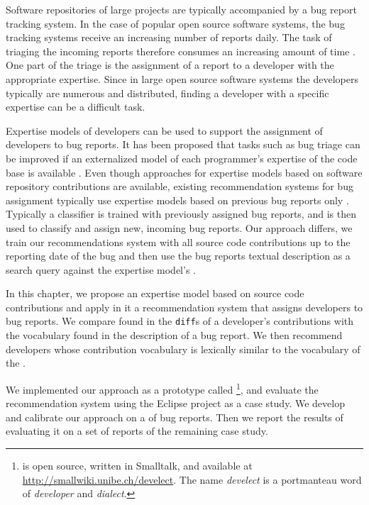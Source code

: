 Software repositories of large projects are typically accompanied by a bug report tracking system. In the case of popular open source software systems, the bug tracking systems receive an increasing number of reports daily. The task of triaging the incoming reports therefore consumes an increasing amount of time \cite{Anvi06b}. One part of the triage is the assignment of a report to a developer with the appropriate expertise. Since in large open source software systems the developers typically are numerous and distributed, finding a developer with a specific expertise can be a difficult task.

Expertise models of developers can be used to support the assignment of developers to bug reports. It has been proposed that tasks such as bug triage can be improved if an externalized model of each programmer's expertise of the code base is available \cite{Frit07a}. Even though approaches for expertise models based on software repository contributions are available, existing recommendation systems for bug assignment typically use expertise models based on previous bug reports only \cite{Anvi06a,Canf05a,Cubr04b,Mock02b,Lucc02a}.
Typically a classifier is trained with previously assigned bug reports, and is then used to classify and assign new, incoming bug reports.
Our approach differs, we train our recommendations system with all source code contributions up to the reporting date of the bug and then use the bug reports textual description as a search query against the expertise model's \TAM.

In this chapter, we propose an expertise model based on source code contributions and apply in it a recommendation system that assigns developers to bug reports. We compare \VOC found in the \verb$diff$s of a developer's contributions with the vocabulary found in the description of a bug report. We then recommend developers whose contribution vocabulary is lexically similar to the vocabulary of the \BR.

We implemented our approach as a prototype called \DEVLECT\footnote{\DEVLECT is open source, written in Smalltalk, and available at \url{http://smallwiki.unibe.ch/develect}. The name \emph{develect} is a portmanteau word of \emph{developer} and \emph{dialect}. }, and evaluate the recommendation system using the Eclipse project as a case study. We develop and calibrate our approach on a \trainingset of bug reports. Then we report the results of evaluating it on a set of reports of the remaining case study.

